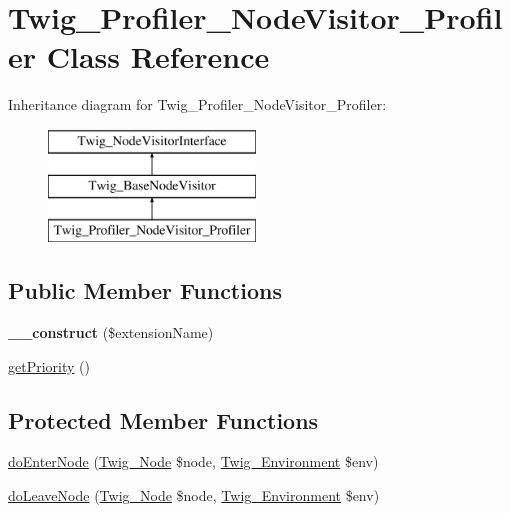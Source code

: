 \hypertarget{classTwig__Profiler__NodeVisitor__Profiler}{}\section{Twig\+\_\+\+Profiler\+\_\+\+Node\+Visitor\+\_\+\+Profiler Class Reference}
\label{classTwig__Profiler__NodeVisitor__Profiler}
Inheritance diagram for Twig\+\_\+\+Profiler\+\_\+\+Node\+Visitor\+\_\+\+Profiler\+:\begin{figure}[H]
\begin{center}
\leavevmode
\includegraphics[height=3.000000cm]{classTwig__Profiler__NodeVisitor__Profiler}
\end{center}
\end{figure}
\subsection*{Public Member Functions}
\begin{DoxyCompactItemize}
\item 
{\bfseries \+\_\+\+\_\+construct} (\$extension\+Name)\hypertarget{classTwig__Profiler__NodeVisitor__Profiler_a18094b9a2b0358651faa203ea1c107e2}{}\label{classTwig__Profiler__NodeVisitor__Profiler_a18094b9a2b0358651faa203ea1c107e2}

\item 
\hyperlink{classTwig__Profiler__NodeVisitor__Profiler_a6d8299caf3d77e31a687cd9e4af45151}{get\+Priority} ()
\end{DoxyCompactItemize}
\subsection*{Protected Member Functions}
\begin{DoxyCompactItemize}
\item 
\hyperlink{classTwig__Profiler__NodeVisitor__Profiler_ab1f31154b7dc7698c839e4d0db6560d5}{do\+Enter\+Node} (\hyperlink{classTwig__Node}{Twig\+\_\+\+Node} \$node, \hyperlink{classTwig__Environment}{Twig\+\_\+\+Environment} \$env)
\item 
\hyperlink{classTwig__Profiler__NodeVisitor__Profiler_a5f2a0f51d35dd5972bb3316f6cd144e4}{do\+Leave\+Node} (\hyperlink{classTwig__Node}{Twig\+\_\+\+Node} \$node, \hyperlink{classTwig__Environment}{Twig\+\_\+\+Environment} \$env)
\end{DoxyCompactItemize}


